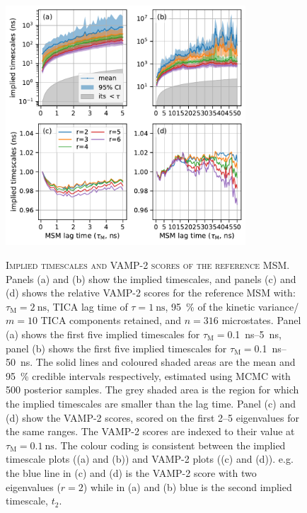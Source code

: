 \begin{figure}
    \centering
    \caption[Implied timescales and VAMP-2 scores of the reference MSM]{\textsc{Implied timescales and VAMP-2 scores of the reference MSM}. Panels (a) and (b) show the implied timescales, and panels (c) and (d) shows the relative VAMP-2 scores for the reference MSM with: $\tau_{\textrm{M}}=\SI{2}{\nano\second}$, TICA lag time of $\tau=\SI{1}{\nano\second}$, \SI{95}{\percent} of the kinetic variance/$m=10$ TICA components retained, and $n=316$ microstates. Panel (a) shows the first five implied timescales for $\tau_{\mathrm{M}}=$\SIrange[range-phrase=\text{--}]{0.1}{5}{\nano\second}, panel (b) shows the first five implied timescales for $\tau_{\mathrm{M}} = $\SIrange[range-phrase=\text{--}]{0.1}{50}{\nano\second}. The solid lines and coloured shaded areas are the mean and \SI{95}{\percent} credible intervals respectively, estimated using MCMC with \num{500} posterior samples. The grey shaded area is the region for which the implied timescales are smaller than the lag time. Panel (c) and (d) show the VAMP-2 scores, scored on the first \numrange{2}{5} eigenvalues for the same ranges. The VAMP-2 scores are indexed to their value at $\tau_{\mathrm{M}}=\SI{0.1}{\nano\second}$. The colour coding is consistent between the implied timescale plots ((a) and (b)) and VAMP-2 plots ((c) and (d)). e.g. the blue line in (c) and (d) is the VAMP-2 score with two eigenvalues ($r=2$) while in (a) and (b) blue is the second implied timescale, $t_{2}$. }
    \includegraphics[width=0.8\textwidth]{chapters/aadh/figures/implied_timescales_D.pdf}
    \label{fig:its_d}
\end{figure}

